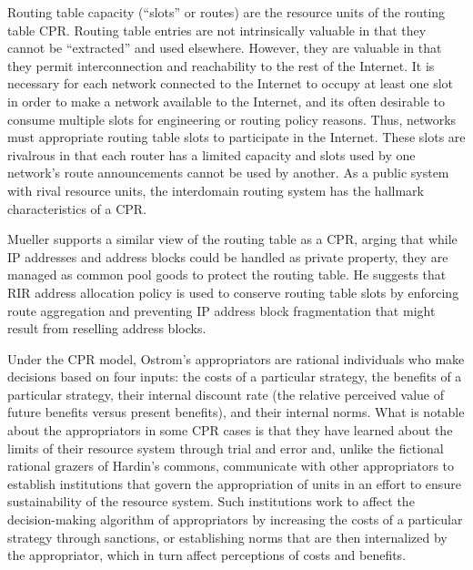 Routing table capacity (``slots'' or routes) are the resource units of the routing table CPR. Routing table entries are not intrinsically valuable in that they cannot be ``extracted'' and used elsewhere. However, they are valuable in that they permit interconnection and reachability to the rest of the Internet. It is necessary for each network connected to the Internet to occupy at least one slot in order to make a network available to the Internet, and its often desirable to consume multiple slots for engineering or routing policy reasons. Thus, networks must appropriate routing table slots to participate in the Internet. These slots are rivalrous in that each router has a limited capacity and slots used by one network's route announcements cannot be used by another. As a public system with rival resource units, the interdomain routing system has the hallmark characteristics of a CPR.

Mueller \cite{Mueller:2010bh} supports a similar view of the routing table as a CPR, arging that while IP addresses and address blocks could be handled as private property, they are managed as common pool goods to protect the routing table. He suggests that RIR address allocation policy is used to conserve routing table slots by enforcing route aggregation and preventing IP address block fragmentation that might result from reselling address blocks.

Under the CPR model, Ostrom's appropriators are rational individuals who make decisions based on four inputs: the costs of a particular strategy, the benefits of a particular strategy, their internal discount rate (the relative perceived value of future benefits versus present benefits), and their internal norms. What is notable about the appropriators in some CPR cases is that they have learned about the limits of their resource system through trial and error and, unlike the fictional rational grazers of Hardin's commons, communicate with other appropriators to establish institutions that govern the appropriation of units in an effort to ensure sustainability of the resource system. Such institutions work to affect the decision-making algorithm of appropriators by increasing the costs of a particular strategy through sanctions, or establishing norms that are then internalized by the appropriator, which in turn affect perceptions of costs and benefits.



